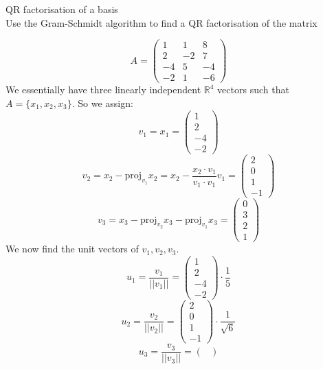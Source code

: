 \documentclass[journal, letterpaper]{IEEEtran}
\begin{document}
    \begin{myboxg}{QR factorisation of a basis} \\ 
        Use the Gram-Schmidt algorithm to find a QR factorisation of the matrix

        $$ A = \begin{pmatrix}
            1 & 1 & 8 \\ 2 & -2 & 7 \\ -4 & 5 & -4 \\ -2 & 1 & -6
        \end{pmatrix}$$
        \newline 
        We essentially have three linearly independent $\mathbb{R}^4$ vectors such that $A = \{x_1, x_2, x_3\}$. So we assign:
        $$v_1 = x_1 = \begin{pmatrix}
            1 \\ 2 \\ -4 \\ -2
        \end{pmatrix}$$
        $$ v_2 = x_2 - \text{proj}_{v_1}x_2 = x_2 - \frac{x_2\cdot v_1}{v_1\cdot v_1} v_1 = \begin{pmatrix}
            2 \\ 0 \\ 1 \\ -1
        \end{pmatrix}$$
        $$ v_3 = x_3 - \text{proj}_{v_2}x_3 - \text{proj}_{v_1}x_3 = \begin{pmatrix}
            0 \\ 3 \\ 2 \\ 1
        \end{pmatrix}$$
        We now find the unit vectors of $v_1, v_2, v_3$.
        $$
        u_1 = \frac{v_1}{||v_1||} = \begin{pmatrix}
            1 \\ 2 \\ -4 \\ -2
        \end{pmatrix} \cdot \frac{1}{5}
        $$
        $$
        u_2 = \frac{v_2}{||v_2||} = \begin{pmatrix}
            2 \\ 0 \\ 1 \\ -1
        \end{pmatrix} \cdot \frac{1}{\sqrt{6}}
        $$
        $$
        u_3 = \frac{v_3}{||v_3||} = \begin{pmatrix}

\end{pmatrix}$$
\end{myboxg}
\end{document}
